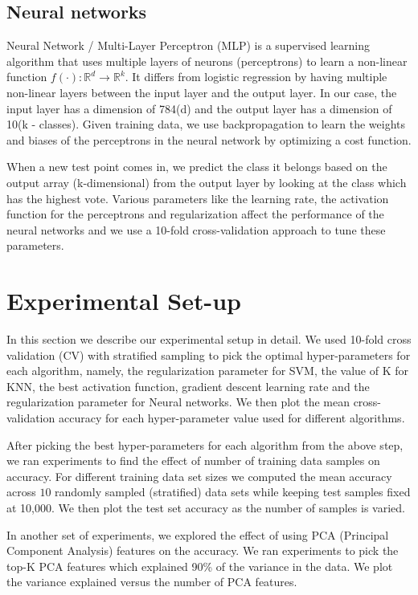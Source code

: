 \documentclass[10pt]{scrartcl}
\begin{document}
\subsection*{Neural networks}
Neural Network / Multi-Layer Perceptron (MLP) is a supervised learning algorithm that uses multiple layers of neurons (perceptrons) to learn a non-linear function $f(\cdot):\mathbb{R}^{d} \rightarrow \mathbb{R}^{k}$. It differs from logistic regression by having multiple non-linear layers between the input layer and the output layer. In our case, the input layer has a dimension of 784(d) and the output layer has a dimension of 10(k - classes). Given training data, we use backpropagation to learn the weights and biases of the perceptrons in the neural network by optimizing a cost function.

When a new test point comes in, we predict the class it belongs based on the output array (k-dimensional) from the output layer by looking at the class which has the highest vote. Various parameters like the learning rate, the activation function for the perceptrons and regularization affect the performance of the neural networks and we use a 10-fold cross-validation approach to tune these parameters. 


\section*{Experimental Set-up}
In this section we describe our experimental setup in detail.
We used 10-fold cross validation (CV) with stratified sampling to pick the optimal hyper-parameters for each algorithm, namely, 
the regularization parameter for SVM, the value of K for KNN, the best activation function, gradient descent learning rate and the regularization parameter for Neural networks. We then plot the mean cross-validation accuracy for each hyper-parameter value used for different algorithms.

After picking the best hyper-parameters for each algorithm from the above step, we ran experiments to find the effect of number of training data samples on accuracy. 
For different training data set sizes we computed the mean accuracy across $10$ randomly sampled (stratified) data sets
while keeping test samples fixed at 10,000. We then plot the test set accuracy as the number of samples is varied.

In another set of experiments, we explored the effect of using PCA (Principal Component Analysis) features on the accuracy.
We ran experiments to pick the top-K PCA features which explained 90\% of the variance in the data. We plot the variance explained
versus the number of PCA features.
\end{document}
